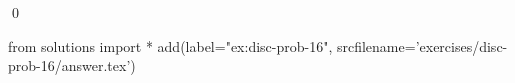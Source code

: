 
\begin{ex} 
  \label{ex:disc-prob-16}
  
  \qed
\end{ex} 
\begin{python0}
from solutions import *
add(label="ex:disc-prob-16",
    srcfilename='exercises/disc-prob-16/answer.tex') 
\end{python0}

